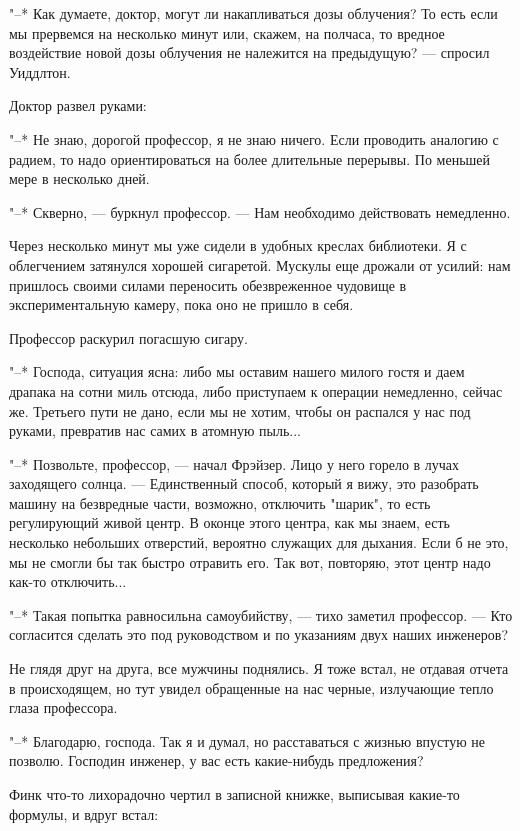 "--* Как думаете, доктор, могут ли накапливаться дозы облучения?  То  есть
если мы прервемся на несколько минут или, скажем, на полчаса,  то  вредное
воздействие новой дозы облучения не належится  на  предыдущую?  ---  спросил
Уиддлтон.

Доктор развел руками:

"--* Не знаю, дорогой профессор, я не знаю ничего. Если проводить аналогию
с радием, то надо ориентироваться на более длительные перерывы. По меньшей
мере в несколько дней.

"--*  Скверно,  ---  буркнул  профессор.  ---   Нам   необходимо   действовать
немедленно.

Через несколько минут мы уже сидели в удобных креслах библиотеки.  Я  с
облегчением затянулся хорошей сигаретой. Мускулы еще  дрожали  от  усилий:
нам  пришлось  своими   силами   переносить   обезвреженное   чудовище   в
экспериментальную камеру, пока оно не пришло в себя.

Профессор раскурил погасшую сигару.

"--* Господа, ситуация ясна: либо мы оставим нашего милого  гостя  и  даем
драпака на сотни миль  отсюда,  либо  приступаем  к  операции  немедленно,
сейчас же. Третьего пути не дано, если мы не хотим, чтобы  он  распался  у
нас под руками, превратив нас самих в атомную пыль...

"--* Позвольте, профессор, --- начал Фрэйзер. Лицо у  него  горело  в  лучах
заходящего солнца. --- Единственный способ, который я  вижу,  это  разобрать
машину  на  безвредные  части,  возможно,  отключить  "шарик",   то   есть
регулирующий живой центр. В  оконце  этого  центра,  как  мы  знаем,  есть
несколько небольших отверстий, вероятно служащих для дыхания.  Если  б  не
это, мы не смогли бы так быстро отравить  его.  Так  вот,  повторяю,  этот
центр надо как-то отключить...

"--* Такая попытка равносильна самоубийству, --- тихо заметил  профессор.  ---
Кто согласится сделать это под руководством  и  по  указаниям  двух  наших
инженеров?

Не глядя друг на друга, все мужчины поднялись. Я тоже встал, не отдавая
отчета в происходящем, но тут увидел обращенные на нас черные,  излучающие
тепло глаза профессора.

"--* Благодарю, господа. Так я и думал, но расставаться с  жизнью  впустую
не позволю. Господин инженер, у вас есть какие-нибудь предложения?

Финк что-то лихорадочно чертил в записной  книжке,  выписывая  какие-то
формулы, и вдруг встал:

